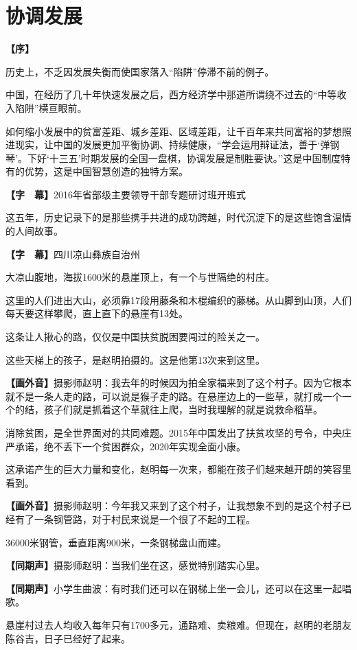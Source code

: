 \documentclass{ctexart}
\newcommand{\zkh}[1]{\textbf{\hspace{-2.7em} 【#1】}}
\begin{document}
\newpage\part{协调发展}

\zkh{序}

历史上，不乏因发展失衡而使国家落入``陷阱''停滞不前的例子。

中国，在经历了几十年快速发展之后，西方经济学中那道所谓绕不过去的``中等收入陷阱''横亘眼前。

如何缩小发展中的贫富差距、城乡差距、区域差距，让千百年来共同富裕的梦想照进现实，让中国的发展更加平衡协调、持续健康，``学会运用辩证法，善于`弹钢琴'。下好`十三五'时期发展的全国一盘棋，协调发展是制胜要诀。''这是中国制度特有的优势，这是中国智慧创造的独特方案。

\zkh{字　幕}2016年省部级主要领导干部专题研讨班开班式

这五年，历史记录下的是那些携手共进的成功跨越，时代沉淀下的是这些饱含温情的人间故事。

\zkh{字　幕}四川凉山彝族自治州

大凉山腹地，海拔1600米的悬崖顶上，有一个与世隔绝的村庄。

这里的人们进出大山，必须靠17段用藤条和木棍编织的藤梯。从山脚到山顶，人们每天要这样攀爬，直上直下的悬崖有13处。

这条让人揪心的路，仅仅是中国扶贫脱困要闯过的险关之一。

这些天梯上的孩子，是赵明拍摄的。这是他第13次来到这里。

\zkh{画外音}摄影师赵明：我去年的时候因为拍全家福来到了这个村子。因为它根本就不是一条人走的路，可以说是猴子走的路。在悬崖边上的一些草，就打成一个一个的结，孩子们就是抓着这个草就往上爬，当时我理解的就是说救命稻草。

消除贫困，是全世界面对的共同难题。2015年中国发出了扶贫攻坚的号令，中央庄严承诺，绝不丢下一个贫困群众，2020年实现全面小康。

这承诺产生的巨大力量和变化，赵明每一次来，都能在孩子们越来越开朗的笑容里看到。

\zkh{画外音}摄影师赵明：今年我又来到了这个村子，让我想象不到的是这个村子已经有了一条钢管路，对于村民来说是一个很了不起的工程。

36000米钢管，垂直距离900米，一条钢梯盘山而建。

\zkh{同期声}摄影师赵明：当我们坐在这，感觉特别踏实心里。

\zkh{同期声}小学生曲波：有时我们还可以在钢梯上坐一会儿，还可以在这里一起唱歌。

悬崖村过去人均收入每年只有1700多元，通路难、卖粮难。但现在，赵明的老朋友陈谷吉，日子已经好了起来。
\end{document}
